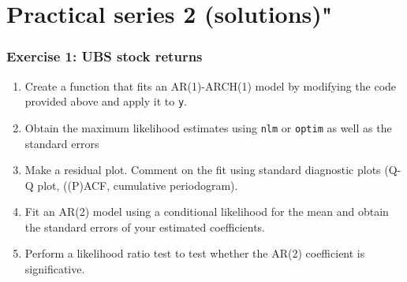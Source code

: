 \documentclass[]{book}
\providecommand{\tightlist}{%
  \setlength{\itemsep}{0pt}\setlength{\parskip}{0pt}}
\begin{document}
\chapter{Practical series 2
(solutions)"}\label{practical-series-2-solutions}

\subsection{Exercise 1: UBS stock
returns}\label{exercise-1-ubs-stock-returns-1}

\begin{enumerate}
\def\labelenumi{\arabic{enumi}.}
\tightlist
\item
  Create a function that fits an AR(1)-ARCH(1) model by modifying the
  code provided above and apply it to \texttt{y}.
\item
  Obtain the maximum likelihood estimates using \texttt{nlm} or
  \texttt{optim} as well as the standard errors
\item
  Make a residual plot. Comment on the fit using standard diagnostic
  plots (Q-Q plot, ((P)ACF, cumulative periodogram).
\item
  Fit an AR(2) model using a conditional likelihood for the mean and
  obtain the standard errors of your estimated coefficients.
\item
  Perform a likelihood ratio test to test whether the AR(2) coefficient
  is significative.
\end{enumerate}
\end{document}
